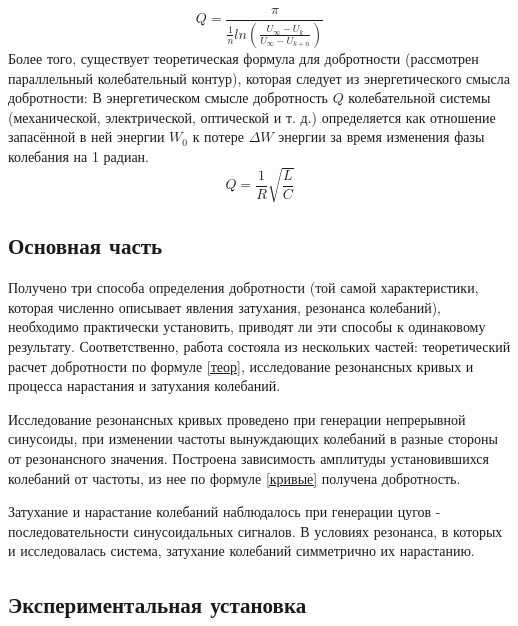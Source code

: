 \documentclass[a4paper,12pt]{article} %
\begin{document}
\begin{equation}
\label{затух}
Q = \frac{\pi}{\frac{1}{n}ln(\frac{U_\infty-U_k}{U_\infty-U_{k+n}})}
\end{equation}
Более того, существует теоретическая формула для добротности (рассмотрен параллельный колебательный контур), которая следует из энергетического смысла добротности: 
В энергетическом смысле добротность $Q$ колебательной системы (механической, электрической, оптической и т. д.) определяется как отношение запасённой в ней энергии $W_0$ к потере $\Delta W$ энергии за время изменения фазы колебания
на 1 радиан.
\begin{equation}
Q = \frac{1}{R}\sqrt{\frac{L}{C}} 
\label{теор}
\end{equation}
\subsection*{Основная часть}
Получено три способа определения добротности (той самой характеристики, которая численно описывает явления затухания, резонанса колебаний), необходимо практически установить, приводят ли эти способы к одинаковому результату. Соответственно, работа состояла из нескольких частей: теоретический расчет добротности по формуле \ref{теор}, исследование резонансных кривых и процесса нарастания и затухания колебаний.

Исследование резонансных кривых проведено при генерации непрерывной синусоиды, при изменении частоты вынуждающих колебаний в разные стороны от резонансного значения. Построена зависимость амплитуды установившихся колебаний от частоты, из нее по формуле \ref{кривые} получена добротность.

Затухание и нарастание колебаний наблюдалось при генерации цугов - последовательности синусоидальных сигналов. В условиях резонанса, в которых и исследовалась система, затухание колебаний симметрично их нарастанию.


\subsection*{Экспериментальная установка}
\end{document}
